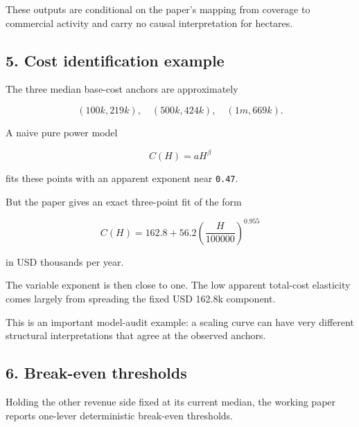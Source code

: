 These outputs are conditional on the paper's mapping from coverage to commercial
activity and carry no causal interpretation for hectares.

\subsection{5. Cost identification example}\label{cost-identification-example}

The three median base-cost anchors are approximately

\[
(100k,219k),\quad(500k,424k),\quad(1m,669k).
\]

A naive pure power model

\[
C(H)=aH^\beta
\]

fits these points with an apparent exponent near \texttt{0.47}.

But the paper gives an exact three-point fit of the form

\[
C(H)=162.8+56.2\left(\frac{H}{100000}\right)^{0.955}
\]

in USD thousands per year.

The variable exponent is then close to one. The low apparent total-cost
elasticity comes largely from spreading the fixed USD 162.8k component.

This is an important model-audit example: a scaling curve can have very
different structural interpretations that agree at the observed anchors.

\subsection{6. Break-even thresholds}\label{break-even-thresholds}

Holding the other revenue side fixed at its current median, the working paper
reports one-lever deterministic break-even thresholds.


